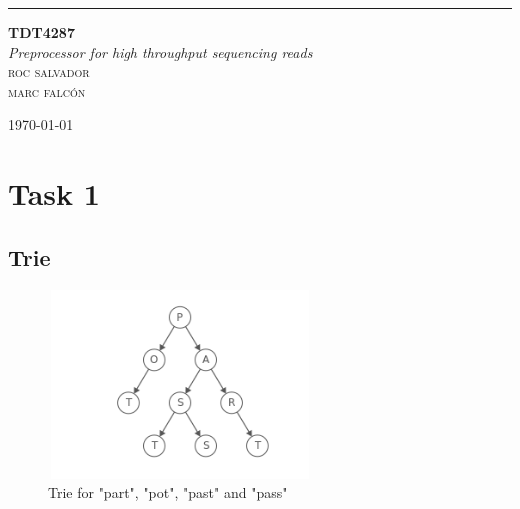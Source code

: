 \documentclass[a4paper,10pt]{article}
\begin{document}
\begin{titlepage} %
	
	\raggedleft %
	
	\rule{1pt}{\textheight} %
	\hspace{0.02\textwidth} %
	\parbox[b]{0.75\textwidth}{ %
		
		{\Huge\bfseries TDT4287}\\[2\baselineskip] %
		{\large\textit{Preprocessor for high throughput sequencing reads}}\\[4\baselineskip] %
		{\Large\textsc{roc salvador\\marc falcón}} %
		
		\vspace{0.5\textheight} %
		
		{\noindent \today}\\[\baselineskip] %
	}

\end{titlepage}


\tableofcontents

\newpage

\section{Task 1}

\subsection{Trie}

\begin{figure}[H]
    \centering
    \includegraphics[width=7cm, height=5cm]{images/trie.png}
    \caption{Trie for "part", "pot", "past" and "pass"}
    \label{trie-example}
\end{figure}
\end{document}
